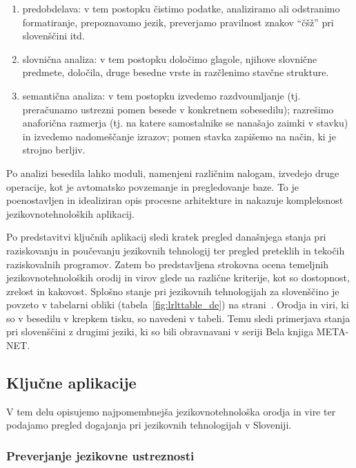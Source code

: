 \begin{multicols}{2}
\begin{enumerate}
\item predobdelava: v tem postopku čistimo podatke, analiziramo ali odstranimo formatiranje, prepoznavamo jezik, preverjamo pravilnost znakov “čšž” pri slovenščini itd.
\item slovnična analiza: v tem postopku določimo glagole, njihove slovnične predmete, določila, druge besedne vrste in razčlenimo stavčne strukture.
\item semantična analiza: v tem postopku izvedemo razdvoumljanje (tj. preračunamo ustrezni pomen besede v konkretnem sobesedilu); razrešimo anaforična razmerja (tj. na katere samostalnike se nanašajo zaimki v stavku) in izvedemo nadomeščanje izrazov; pomen stavka zapišemo na način, ki je stroj\-no berljiv.
\end{enumerate}

Po analizi besedila lahko moduli, namenjeni različnim nalogam, izvedejo druge operacije, kot je avtomatsko povzemanje in pregledovanje baze. To je poenostav\-ljen in idealiziran opis procesne arhitekture in nakazuje kompleksnost jezikovnotehnoloških aplikacij.

Po predstavitvi ključnih aplikacij sledi kratek pregled današnjega stanja pri raziskovanju in poučevanju jezikovnih tehnologij ter pregled preteklih in tekočih raziskovalnih programov. Zatem bo predstav\-ljena strokovna ocena temeljnih jezikovnotehnoloških orodij in virov glede na različne kriterije, kot so dostopnost, zrelost in kakovost. Splošno stanje pri jezikovnih tehnologijah za slovenščino je povzeto v tabelarni obliki (tabela~\ref{fig:lrlttable_de}) na strani~\pageref{fig:lrlttable_de}. Orodja in viri, ki so v besedilu v krepkem tisku, so navedeni v tabeli. Temu sledi primerjava stanja pri slovenščini z drugimi jeziki, ki so bili obravnavani v seriji Bela knjiga META-NET.

\subsection{Ključne aplikacije} 

V tem delu opisujemo naj\-pomem\-bnej\-ša jezikovno\-tehnološka orodja in vire ter podajamo pregled dogajanja pri jezikovnih tehnologijah v Sloveniji.

\subsubsection{Preverjanje jezikovne ustreznosti}


\end{multicols}
